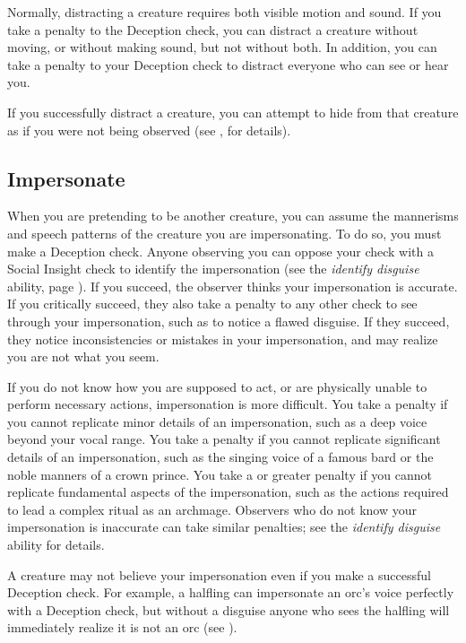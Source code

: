         Normally, distracting a creature requires both visible motion and sound.
        If you take a  penalty to the Deception check, you can distract a creature without moving, or without making sound, but not without both.
        In addition, you can take a  penalty to your Deception check to distract everyone who can see or hear you.

        If you successfully distract a creature, you can attempt to hide from that creature as if you were not being observed (see , for details).

    \subsection{Impersonate}\label{Impersonate}
        When you are pretending to be another creature, you can assume the mannerisms and speech patterns of the creature you are impersonating.
        To do so, you must make a Deception check.
        Anyone observing you can oppose your check with a Social Insight check to identify the impersonation (see the \textit{identify disguise} ability, page ).
        If you succeed, the observer thinks your impersonation is accurate.
        If you critically succeed, they also take a  penalty to any other check to see through your impersonation, such as to notice a flawed disguise.
        If they succeed, they notice inconsistencies or mistakes in your impersonation, and may realize you are not what you seem.

        If you do not know how you are supposed to act, or are physically unable to perform necessary actions, impersonation is more difficult.
        You take a  penalty if you cannot replicate minor details of an impersonation, such as a deep voice beyond your vocal range.
        You take a  penalty if you cannot replicate significant details of an impersonation, such as the singing voice of a famous bard or the noble manners of a crown prince.
        You take a  or greater penalty if you cannot replicate fundamental aspects of the impersonation, such as the actions required to lead a complex ritual as an archmage.
        Observers who do not know your impersonation is inaccurate can take similar penalties; see the \textit{identify disguise} ability for details.

        A creature may not believe your impersonation even if you make a successful Deception check.
        For example, a halfling can impersonate an orc's voice perfectly with a Deception check, but without a disguise anyone who sees the halfling will immediately realize it is not an orc (see ).

